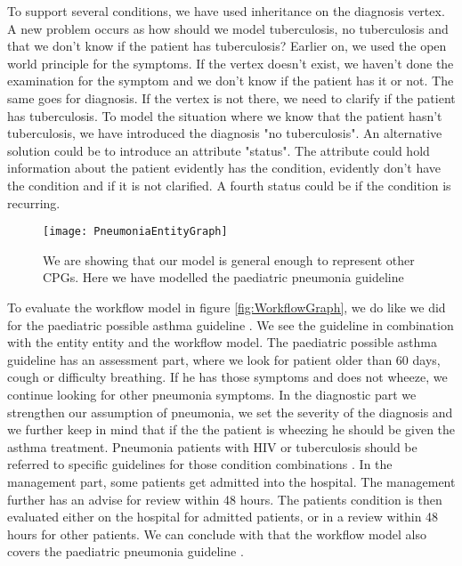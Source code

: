 To support several conditions, we have used inheritance on the diagnosis vertex. A new problem occurs as how should we model tuberculosis, no tuberculosis and that we don't know if the patient has tuberculosis? Earlier on, we used the open world principle for the symptoms. If the vertex doesn't exist, we haven't done the examination for the symptom and we don't know if the patient has it or not. The same goes for diagnosis. If the vertex is not there, we need to clarify if the patient has tuberculosis. To model the situation where we know that the patient hasn't tuberculosis, we have introduced the diagnosis "no tuberculosis". An alternative solution could be to introduce an attribute "status". The attribute could hold information about the patient evidently has the condition, evidently don't have the condition and if it is not clarified. A fourth status could be if the condition is recurring.

\begin{figure}[h!]
	\label{fig:PneumoniaEntityGraph}
	\texttt{[image: PneumoniaEntityGraph]}
	\caption {We are showing that our model is general enough to represent other CPGs. Here we have modelled the paediatric pneumonia guideline \parencite{RepublicofKeny2016}}
\end{figure}

To evaluate the workflow model in figure \ref{fig:WorkflowGraph}, we do like we did for the paediatric possible asthma guideline \parencite{RepublicofKeny2016}. We see the guideline in combination with the entity entity and the workflow model. The paediatric possible asthma guideline \parencite{RepublicofKeny2016} has an assessment part, where we look for patient older than 60 days, cough or difficulty breathing. If he has those symptoms and does not wheeze, we continue looking for other pneumonia symptoms. In the diagnostic part we strengthen our assumption of pneumonia, we set the severity of the diagnosis and we further keep in mind that if the the patient is wheezing he should be given the asthma treatment. Pneumonia patients with HIV or tuberculosis should be referred to specific guidelines for those condition combinations \parencite{RepublicofKeny2016}. In the management part, some patients get admitted into the hospital. The management further has an advise for review within 48 hours. The patients condition is then evaluated either on the hospital for admitted patients, or in a review within 48 hours for other patients. We can conclude with that the workflow model  also covers the paediatric pneumonia guideline \parencite{RepublicofKeny2016}.

